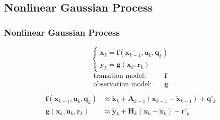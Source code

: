 \documentclass[14pt,hyperref={CJKbookmarks=true}]{beamer}
\theoremstyle{plain}
\theoremstyle{definition}
\theoremstyle{remark}
\begin{document}
\subsection{Nonlinear Gaussian Process}
\begin{frame}

\frametitle{Nonlinear Gaussian Process} 
\small
\begin{equation}
\begin{cases}
\mathbf{x}_k=\mathbf{f}(\mathbf{x}_{k-1},\mathbf{u}_{k},\mathbf{q}_{k})\\
\mathbf{y}_k=\mathbf{g}(\mathbf{x}_k,\mathbf{r}_k)
\end{cases} 
\end{equation}
\begin{equation*}
\begin{split}
\text{transition model:}\quad& \mathbf{f}\\
\text{observation model:}\quad& \mathbf{g}\\
\end{split}
\end{equation*}
\pause
\begin{equation}
\begin{split}
\mathbf{f}(\mathbf{x}_{k-1},\mathbf{u}_{k},\mathbf{q}_{k})&\approx\check{\mathbf{x}}_k+\mathbf{A}_{k-1}(\mathbf{x}_{k-1}-\check{\mathbf{x}}_{k-1})+\mathbf{q}'_k\\
\mathbf{g}(\mathbf{x}_{k},\mathbf{u}_{k},\mathbf{r}_{k})&\approx\check{\mathbf{y}}_k+\mathbf{H}_{k}(\mathbf{x}_{k}-\check{\mathbf{x}}_{k})+\mathbf{r}'_k
\end{split}
\end{equation}
\end{frame}
\end{document}
